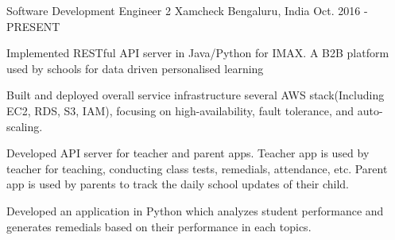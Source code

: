

\begin{cventries}

  \cventry
    {Software Development Engineer 2} %
    {Xamcheck} %
    {Bengaluru, India} %
    {Oct. 2016 - PRESENT} %
    {
      \begin{cvitems} %
        \item {Implemented RESTful API server in Java/Python for IMAX. A B2B platform used by schools for data driven personalised learning}
        \item {Built and deployed overall service infrastructure several AWS stack(Including EC2, RDS, S3, IAM), focusing on high-availability, fault tolerance, and auto-scaling.}
        \item {Developed API server for teacher and parent apps. Teacher app is used by teacher for teaching, conducting class tests, remedials, attendance, etc. Parent app is used by parents to track the daily school updates of their child.}
        \item {Developed an application in Python which analyzes student performance and generates remedials based on their performance in each topics.}
      \end{cvitems}
    }


\end{cventries}
